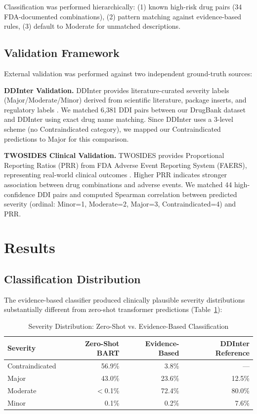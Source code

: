 \documentclass[11pt,a4paper]{article}
\begin{document}
Classification was performed hierarchically: (1) known high-risk drug pairs (34 FDA-documented combinations), (2) pattern matching against evidence-based rules, (3) default to Moderate for unmatched descriptions.

\subsection*{Validation Framework}

External validation was performed against two independent ground-truth sources:

\textbf{DDInter Validation.} DDInter provides literature-curated severity labels (Major/Moderate/Minor) derived from scientific literature, package inserts, and regulatory labels \cite{ddinter2022}. We matched 6,381 DDI pairs between our DrugBank dataset and DDInter using exact drug name matching. Since DDInter uses a 3-level scheme (no Contraindicated category), we mapped our Contraindicated predictions to Major for this comparison.

\textbf{TWOSIDES Clinical Validation.} TWOSIDES provides Proportional Reporting Ratios (PRR) from FDA Adverse Event Reporting System (FAERS), representing real-world clinical outcomes \cite{tatonetti2012}. Higher PRR indicates stronger association between drug combinations and adverse events. We matched 44 high-confidence DDI pairs and computed Spearman correlation between predicted severity (ordinal: Minor=1, Moderate=2, Major=3, Contraindicated=4) and PRR.

\section*{Results}

\subsection*{Classification Distribution}

The evidence-based classifier produced clinically plausible severity distributions substantially different from zero-shot transformer predictions (Table~\ref{tab:dist}):

\begin{table}[h]
\centering
\small
\caption{Severity Distribution: Zero-Shot vs. Evidence-Based Classification}
\label{tab:dist}
\begin{tabular}{@{}lrrr@{}}
\toprule
\textbf{Severity} & \textbf{Zero-Shot BART} & \textbf{Evidence-Based} & \textbf{DDInter Reference} \\
\midrule
Contraindicated & 56.9\% & 3.8\% & --- \\
Major & 43.0\% & 23.6\% & 12.5\% \\
Moderate & $<$0.1\% & 72.4\% & 80.0\% \\
Minor & 0.1\% & 0.2\% & 7.6\% \\
\bottomrule
\end{tabular}
\end{table}
\end{document}
